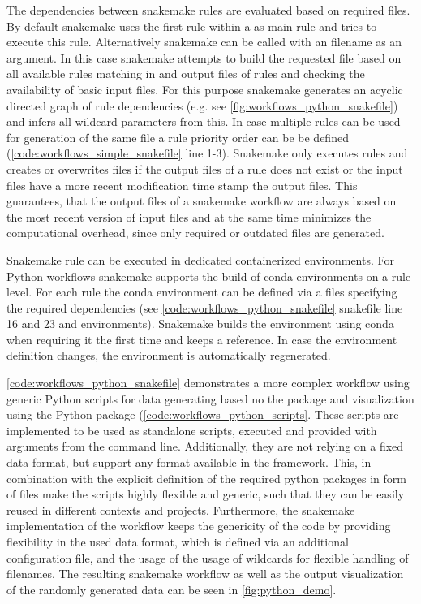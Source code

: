 The dependencies between snakemake rules are evaluated based on required files. By default snakemake uses the first rule within a  as main rule and tries to execute this rule. Alternatively snakemake can be called with an filename as an argument. In this case snakemake attempts to build the requested file based on all available rules matching in and output files of rules and checking the availability of basic input files. For this purpose snakemake generates an acyclic directed graph of rule dependencies (e.g. see \cref{fig:workflows_python_snakefile}) and infers all wildcard parameters from this. In case multiple rules can be used for generation of the same file a rule priority order can be be defined (\cref{code:workflows_simple_snakefile} line 1-3). Snakemake only executes rules and creates or overwrites files if the output files of a rule does not exist or the input files have a more recent modification time stamp the output files. This guarantees, that the output files of a snakemake workflow are always based on the most recent version of input files and at the same time minimizes the computational overhead, since only required or outdated files are generated.

Snakemake rule can be executed in dedicated containerized environments. For Python workflows snakemake supports the build of conda environments on a rule level. For each rule the conda environment can be defined via a  files specifying the required dependencies (see \cref{code:workflows_python_snakefile} snakefile line 16 and 23 and environments). Snakemake builds the environment using conda when requiring it the first time and keeps a reference. In case the  environment definition changes, the environment is automatically regenerated.

\cref{code:workflows_python_snakefile} demonstrates a more complex workflow using generic Python scripts for data generating based no the  package and visualization using the Python  package (\cref{code:workflows_python_scripts}. These scripts are implemented to be used as standalone scripts, executed and provided with arguments from the command line. Additionally, they are not relying on a fixed data format, but support any format available in the  framework. This, in combination with the explicit definition of the required python packages in form of  files make the scripts highly flexible and generic, such that they can be easily reused in different contexts and projects. Furthermore, the snakemake implementation of the workflow keeps the genericity of the code by providing flexibility in the used data format, which is defined via an additional configuration  file, and the usage of the usage of wildcards for flexible handling of filenames. The resulting snakemake workflow as well as the output visualization of the randomly generated data can be seen in \cref{fig:python_demo}.


